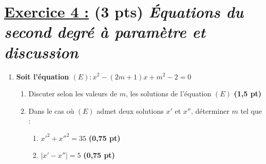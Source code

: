 \documentclass[12pt,a4paper]{article}
\begin{document}
\section*{\underline{ Exercice 4 :} (3 pts) \small\itshape Équations du second degré à paramètre et discussion}

\begin{enumerate}
    \item \textbf{Soit l'équation $(E) : x^2 - (2m + 1)x + m^2 - 2 = 0$}
    
    \begin{enumerate}
        \item Discuter selon les valeurs de $m$, les solutions de l'équation $(E)$ \hfill \textbf{(1,5 pt)}
        
        \item Dans le cas où $(E)$ admet deux solutions $x'$ et $x''$, déterminer $m$ tel que :
        \begin{enumerate}
            \item $x'^2 + x''^2 = 35$ \hfill \textbf{(0,75 pt)}
            \item $|x' - x''| = 5$ \hfill \textbf{(0,75 pt)}
        \end{enumerate}
    \end{enumerate}

\end{enumerate}
\end{document}

